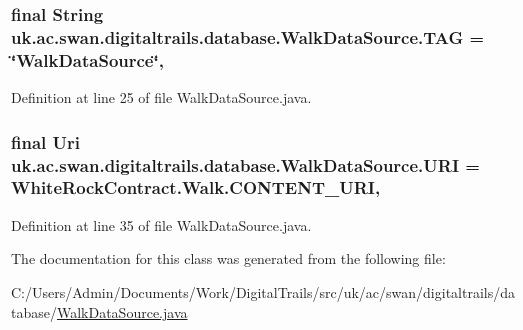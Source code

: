 \hypertarget{classuk_1_1ac_1_1swan_1_1digitaltrails_1_1database_1_1_walk_data_source_a9dcba1107f900092747d2c48a9b39e66}{
\subsubsection[{T\+A\+G}]{\setlength{\rightskip}{0pt plus 5cm}final String uk.\+ac.\+swan.\+digitaltrails.\+database.\+Walk\+Data\+Source.\+T\+A\+G = \char`\"{}Walk\+Data\+Source\char`\"{}\hspace{0.3cm}{\ttfamily [static]}, {\ttfamily [private]}}}\label{classuk_1_1ac_1_1swan_1_1digitaltrails_1_1database_1_1_walk_data_source_a9dcba1107f900092747d2c48a9b39e66}


Definition at line 25 of file Walk\+Data\+Source.\+java.

\hypertarget{classuk_1_1ac_1_1swan_1_1digitaltrails_1_1database_1_1_walk_data_source_a25d2abfa8f1fd8a0339f40a83bd9fb89}{
\subsubsection[{U\+R\+I}]{\setlength{\rightskip}{0pt plus 5cm}final Uri uk.\+ac.\+swan.\+digitaltrails.\+database.\+Walk\+Data\+Source.\+U\+R\+I = {\bf White\+Rock\+Contract.\+Walk.\+C\+O\+N\+T\+E\+N\+T\+\_\+\+U\+R\+I}\hspace{0.3cm}{\ttfamily [static]}, {\ttfamily [private]}}}\label{classuk_1_1ac_1_1swan_1_1digitaltrails_1_1database_1_1_walk_data_source_a25d2abfa8f1fd8a0339f40a83bd9fb89}


Definition at line 35 of file Walk\+Data\+Source.\+java.



The documentation for this class was generated from the following file\+:\begin{DoxyCompactItemize}
\item 
C\+:/\+Users/\+Admin/\+Documents/\+Work/\+Digital\+Trails/src/uk/ac/swan/digitaltrails/database/\hyperlink{_walk_data_source_8java}{Walk\+Data\+Source.\+java}\end{DoxyCompactItemize}
